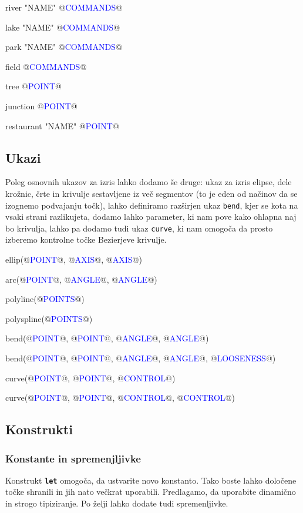 \documentclass{article}
\newcommand\Var[1]{\textcolor{blue}{#1}}
\newcommand\Keyword[1]{{\textbf{\texttt{#1}}}}
\newcommand\Fun[1]{{\texttt{#1}}}
\begin{document}
\begin{CITY}
  river "NAME" {
    @\Var{COMMANDS}@
  }

  lake "NAME" {
    @\Var{COMMANDS}@
  }

  park "NAME" {
    @\Var{COMMANDS}@
  }

  field {
    @\Var{COMMANDS}@
  }

  tree @\Var{POINT}@

  junction @\Var{POINT}@

  restaurant "NAME" @\Var{POINT}@
\end{CITY}

\subsection{Ukazi}
Poleg osnovnih ukazov za izris lahko dodamo še druge: ukaz za izris elipse, dele krožnic, črte in krivulje sestavljene iz več segmentov (to je eden od načinov da se izognemo podvajanju točk), lahko definiramo razširjen ukaz \Fun{bend}, kjer se kota na vsaki strani razlikujeta, dodamo lahko parameter, ki nam pove kako ohlapna naj bo krivulja, lahko pa dodamo tudi ukaz \Fun{curve}, ki nam omogoča da prosto izberemo kontrolne točke Bezierjeve krivulje.

\begin{CITY}
  ellip(@\Var{POINT}@, @\Var{AXIS}@, @\Var{AXIS}@)

  arc(@\Var{POINT}@, @\Var{ANGLE}@, @\Var{ANGLE}@)

  polyline(@\Var{POINTS}@)

  polyspline(@\Var{POINTS}@)

  bend(@\Var{POINT}@, @\Var{POINT}@, @\Var{ANGLE}@, @\Var{ANGLE}@)

  bend(@\Var{POINT}@, @\Var{POINT}@, @\Var{ANGLE}@, @\Var{ANGLE}@, @\Var{LOOSENESS}@)

  curve(@\Var{POINT}@, @\Var{POINT}@, @\Var{CONTROL}@)

  curve(@\Var{POINT}@, @\Var{POINT}@, @\Var{CONTROL}@, @\Var{CONTROL}@)
\end{CITY}

\subsection{Konstrukti}

\subsubsection{Konstante in spremenjljivke}
Konstrukt \Keyword{let} omogoča, da ustvarite novo konstanto.
Tako boste lahko določene točke shranili in jih nato večkrat uporabili.
Predlagamo, da uporabite dinamično in strogo tipiziranje.
Po želji lahko dodate tudi spremenljivke.
\end{document}
